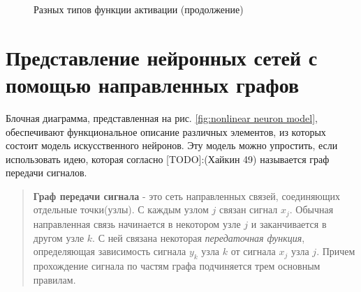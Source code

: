 \documentclass[a4paper,12pt]{report}
\begin{document}
\begin{figure}[!hbt]
    \centering
    \hspace{10pt}
    \caption{Разных типов функции активации
    (продолжение)}
\end{figure}

\section{Представление нейронных сетей с помощью направленных графов}
\label{sec:graphs}
Блочная диаграмма, представленная на рис. \ref{fig:nonlinear neuron model},
обеспечивают функциональное описание различных элементов, из
которых состоит модель искусственного нейронов. Эту модель можно
упростить, если использовать идею, которая согласно [TODO]:(Хайкин 49)
называется граф передачи сигналов.
\begin{quote}
    \textbf{Граф передачи сигнала} - это сеть направленных связей,
    соединяющих отдельные точки(узлы). С каждым узлом $j$ связан
    сигнал $x_j$. Обычная направленная связь начинается в некотором
    узле $j$ и заканчивается в другом узле $k$. С ней связана
    некоторая \textit{передаточная функция}, определяющая зависимость
    сигнала
    $y_k$ узла $k$ от сигнала $x_j$ узла $j$. Причем прохождение
    сигнала по частям графа подчиняется трем основным правилам.
\end{quote}
\end{document}
